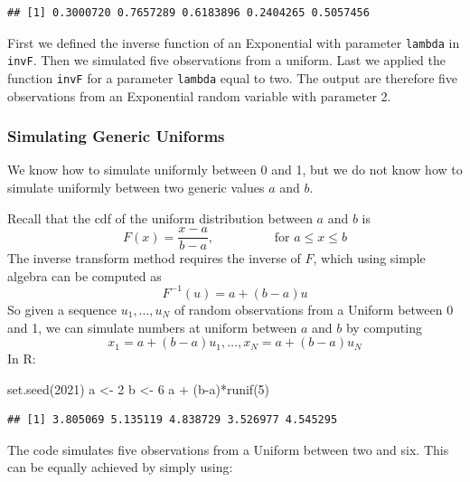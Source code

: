 \documentclass[
]{book}
\newenvironment{Shaded}{\begin{snugshade}}{\end{snugshade}}
\newcommand{\DecValTok}[1]{\textcolor[rgb]{0.00,0.00,0.81}{#1}}
\newcommand{\FunctionTok}[1]{\textcolor[rgb]{0.00,0.00,0.00}{#1}}
\newcommand{\NormalTok}[1]{#1}
\newcommand{\OtherTok}[1]{\textcolor[rgb]{0.56,0.35,0.01}{#1}}
\newcommand{\SpecialCharTok}[1]{\textcolor[rgb]{0.00,0.00,0.00}{#1}}
\theoremstyle{definition}
\theoremstyle{definition}
\theoremstyle{definition}
\theoremstyle{definition}
\theoremstyle{remark}
\begin{document}
\begin{verbatim}
## [1] 0.3000720 0.7657289 0.6183896 0.2404265 0.5057456
\end{verbatim}

First we defined the inverse function of an Exponential with parameter \texttt{lambda} in \texttt{invF}. Then we simulated five observations from a uniform. Last we applied the function \texttt{invF} for a parameter \texttt{lambda} equal to two. The output are therefore five observations from an Exponential random variable with parameter 2.

\hypertarget{simulating-generic-uniforms}{%
\subsubsection{Simulating Generic Uniforms}\label{simulating-generic-uniforms}}

We know how to simulate uniformly between 0 and 1, but we do not know how to simulate uniformly between two generic values \(a\) and \(b\).

Recall that the cdf of the uniform distribution between \(a\) and \(b\) is
\[
F(x)=\frac{x-a}{b-a}, \hspace{2cm} \mbox{for } a\leq x \leq b
\]
The inverse transform method requires the inverse of \(F\), which using simple algebra can be computed as
\[
F^{-1}(u)=a + (b-a)u
\]
So given a sequence \(u_1,\dots,u_N\) of random observations from a Uniform between 0 and 1, we can simulate numbers at uniform between \(a\) and \(b\) by computing
\[
x_1 = a + (b-a)u_1,\dots, x_N=a+(b-a)u_N
\]
In R:

\begin{Shaded}
\begin{Highlighting}[]
\FunctionTok{set.seed}\NormalTok{(}\DecValTok{2021}\NormalTok{)}
\NormalTok{a }\OtherTok{\textless{}{-}} \DecValTok{2}
\NormalTok{b }\OtherTok{\textless{}{-}} \DecValTok{6}
\NormalTok{a }\SpecialCharTok{+}\NormalTok{ (b}\SpecialCharTok{{-}}\NormalTok{a)}\SpecialCharTok{*}\FunctionTok{runif}\NormalTok{(}\DecValTok{5}\NormalTok{)}
\end{Highlighting}
\end{Shaded}

\begin{verbatim}
## [1] 3.805069 5.135119 4.838729 3.526977 4.545295
\end{verbatim}

The code simulates five observations from a Uniform between two and six. This can be equally achieved by simply using:
\end{document}
